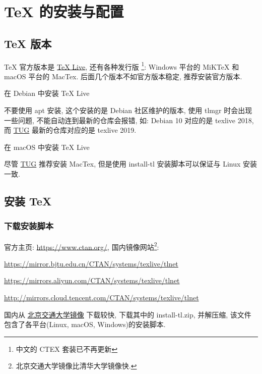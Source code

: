 \chapter{{\TeX} 的安装与配置}

\section{{\TeX} 版本}

{\TeX} 官方版本是 \href{http://www.tug.org/texlive}{{\TeX} Live}, 还有各种发行版
\footnote{中文的 CTEX 套装已不再更新}: Windows 平台的 MiKTeX 和 macOS 平台的 MacTex. 
后面几个版本不如官方版本稳定, 推荐安装官方版本.

\begin{compactitems}
    \item{在 Debian 中安装 {\TeX} Live}

    不要使用 apt 安装, 这个安装的是 Debian 社区维护的版本, 使用 tlmgr 时会出现一些问题, 
    不能自动连到最新的仓库会报错, 如: Debian 10 对应的是 texlive 2018, 
    而 \href{https://tug.org/}{TUG} 最新的仓库对应的是 texlive 2019.

    \item{在 macOS 中安装 {\TeX} Live}

    尽管 \href{https://tug.org/}{TUG} 推荐安装 MacTex, 但是使用 install-tl 安装脚本可以保证与 Linux 安装一致. 
\end{compactitems}

\section{安装 {\TeX}}

\subsection{下载安装脚本}

官方主页: \url{https://www.ctan.org/}, 国内镜像网站\footnote{北京交通大学镜像比清华大学镜像快.}:

\begin{compactitems}
    \item \url{https://mirror.bjtu.edu.cn/CTAN/systems/texlive/tlnet}
    \item \url{https://mirrors.aliyun.com/CTAN/systems/texlive/tlnet}
    \item \url{http://mirrors.cloud.tencent.com/CTAN/systems/texlive/tlnet}
\end{compactitems}

国内从 \href{https://mirror.bjtu.edu.cn/CTAN/systems/texlive/tlnet}{北京交通大学镜像} 下载较快, 
下载其中的 install-tl.zip, 并解压缩, 该文件包含了各平台(Linux, macOS, Windows)的安装脚本.

